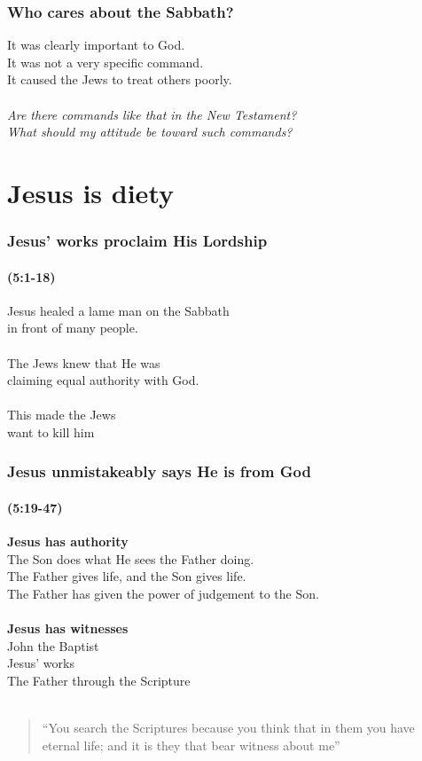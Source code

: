 \begin{frame}
\frametitle{Who cares about the Sabbath?}
It was clearly important to God.\\
It was not a very specific command.\\
It caused the Jews to treat others poorly.\\~\\
\emph{Are there commands like that in the New Testament?}\\
\emph{What should my attitude be toward such commands?}\\
\end{frame}

\begin{frame}
\frametitle{\insertlecture}
\tableofcontents[sectionstyle=show/show]
\end{frame}

\section{Jesus is diety}
\begin{frame}
\frametitle{Jesus' works proclaim His Lordship}
\framesubtitle{(5:1-18)}
Jesus healed a lame man on the Sabbath\\in front of many people.\\~\\
The Jews knew that He was\\claiming equal authority with God.\\~\\
This made the Jews\\want to kill him
\end{frame}

\begin{frame}
\frametitle{Jesus unmistakeably says He is from God}
\framesubtitle{(5:19-47)}
\textbf{Jesus has authority}\\
The Son does what He sees the Father doing.\\
The Father gives life, and the Son gives life.\\
The Father has given the power of judgement to the Son.\\~\\
\textbf{Jesus has witnesses}\\
John the Baptist\\
Jesus' works\\
The Father through the Scripture\\~\\
\begin{quote}
``You search the Scriptures because you think that in them you have eternal life; and it is they that bear witness about me''

\end{quote}
\end{frame}

